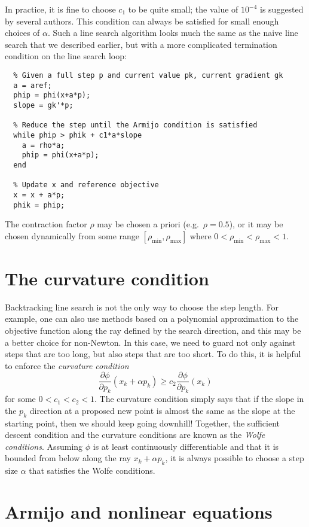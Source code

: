 \documentclass[12pt, leqno]{article} %
\begin{document}
In practice, it is fine to choose $c_1$ to
be quite small; the value of $10^{-4}$ is suggested by several
authors.  This condition can always be satisfied for small enough
choices of $\alpha$.  Such a line search algorithm looks much the
same as the naive line search that we described earlier, but with
a more complicated termination condition on the line search loop:
\begin{lstlisting}
  % Given a full step p and current value pk, current gradient gk
  a = aref;
  phip = phi(x+a*p);
  slope = gk'*p;

  % Reduce the step until the Armijo condition is satisfied
  while phip > phik + c1*a*slope
    a = rho*a;
    phip = phi(x+a*p);
  end

  % Update x and reference objective
  x = x + a*p;
  phik = phip;
\end{lstlisting}
The contraction factor $\rho$ may be chosen a priori
(e.g.~$\rho = 0.5$), or it may be chosen dynamically from some range
$[\rho_{\min}, \rho_{\max}]$ where $0 < \rho_{\min} < \rho_{\max} < 1$.

\section{The curvature condition}

Backtracking line search is not the only way to choose the step
length.  For example, one can also use methods based on a polynomial
approximation to the objective function along the ray defined by the
search direction, and this may be a better choice for non-Newton.
In this case, we need to guard not only against steps that are too
long, but also steps that are too short.  To do this, it is helpful
to enforce the {\em curvature condition}
\[
  \frac{\partial \phi}{\partial p_k}(x_k+\alpha p_k) \geq c_2
  \frac{\partial \phi}{\partial p_k}(x_k)
\]
for some $0 < c_1 < c_2 < 1$.  The curvature condition simply says
that if the slope in the $p_k$ direction at a proposed new point
is almost the same as the slope at the starting point, then we
should keep going downhill!  Together, the sufficient descent
condition and the curvature conditions are known as the
{\em Wolfe conditions}.  Assuming $\phi$ is at least continuously
differentiable and that it is bounded from below along the ray
$x_k+\alpha p_k$, it is always possible to choose a step size $\alpha$
that satisfies the Wolfe conditions.

\section{Armijo and nonlinear equations}
\end{document}

